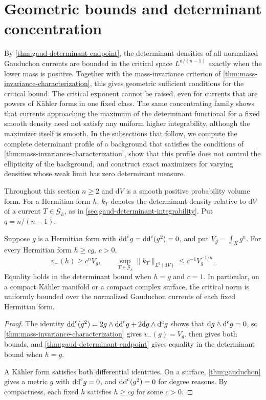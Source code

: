\section{Geometric bounds and determinant concentration}
\label{sec:gaud-determinant-concentration}

By \cref{thm:gaud-determinant-endpoint}, the determinant densities of all normalized Gauduchon currents are bounded in the critical space $L^{n/(n-1)}$ exactly when the lower mass is positive. Together with the mass-invariance criterion of \cref{thm:mass-invariance-characterization}, this gives geometric sufficient conditions for the critical bound. The critical exponent cannot be raised, even for currents that are powers of K\"ahler forms in one fixed class. The same concentrating family shows that currents approaching the maximum of the determinant functional for a fixed smooth density need not satisfy any uniform higher integrability, although the maximizer itself is smooth. In the subsections that follow, we compute the complete determinant profile of a background that satisfies the conditions of \cref{thm:mass-invariance-characterization}, show that this profile does not control the ellipticity of the background, and construct exact maximizers for varying densities whose weak limit has zero determinant measure.

Throughout this section $n\geq2$ and $\mathrm{d}V$ is a smooth positive probability volume form. For a Hermitian form $h$, $k_T$ denotes the determinant density relative to $\mathrm{d}V$ of a current $T\in\mathscr G_h$, as in \cref{sec:gaud-determinant-integrability}. Put $q=n/(n-1)$.

\begin{corollary}\label{cor:geometric-determinant-bound}
Suppose $g$ is a Hermitian form with $\mathrm{dd}^{\mathrm{c}} g=\mathrm{dd}^{\mathrm{c}}(g^2)=0$, and put $V_g=\int_Xg^n$. For every Hermitian form $h\geq cg$, $c>0$,
\[
 v_-(h)\geq c^nV_g,\qquad
 \sup_{T\in\mathscr G_h}\|k_T\|_{L^q(\mathrm{d}V)}
       \leq c^{-1}V_g^{-1/n}.
\]
Equality holds in the determinant bound when $h=g$ and $c=1$. In particular, on a compact K\"ahler manifold or a compact complex surface, the critical norm is uniformly bounded over the normalized Gauduchon currents of each fixed Hermitian form.
\end{corollary}
\begin{proof}
The identity $\mathrm{dd}^{\mathrm{c}}(g^2)=2g\wedge\mathrm{dd}^{\mathrm{c}} g+2\mathrm{d}g\wedge\mathrm d^{\mathrm c} g$ shows that $\mathrm{d}g\wedge\mathrm d^{\mathrm c} g=0$, so \cref{thm:mass-invariance-characterization} gives $v_-(g)=V_g$.  then gives both bounds, and \cref{thm:gaud-determinant-endpoint} gives equality in the determinant bound when $h=g$.

A K\"ahler form satisfies both differential identities. On a surface, \cref{thm:gauduchon} gives a metric $g$ with $\mathrm{dd}^{\mathrm{c}} g=0$, and $\mathrm{dd}^{\mathrm{c}}(g^2)=0$ for degree reasons. By compactness, each fixed $h$ satisfies $h\geq cg$ for some $c>0$.
\end{proof}

